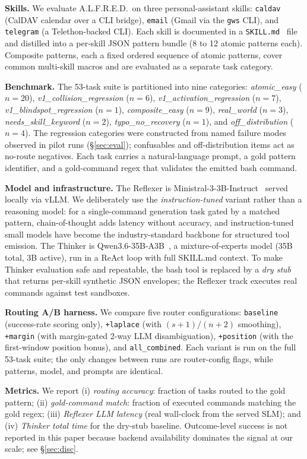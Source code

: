 \label{sec:method}

\textbf{Skills.} We evaluate A.L.F.R.E.D.\ on three personal-assistant skills: \texttt{caldav} (CalDAV calendar over a CLI bridge), \texttt{email} (Gmail via the \texttt{gws} CLI), and \texttt{telegram} (a Telethon-backed CLI). Each skill is documented in a \texttt{SKILL.md}~\cite{anthropic2025skills} file and distilled into a per-skill JSON pattern bundle (8 to 12 atomic patterns each). Composite patterns, each a fixed ordered sequence of atomic patterns, cover common multi-skill macros and are evaluated as a separate task category.

\textbf{Benchmark.} The 53-task suite is partitioned into nine categories: \emph{atomic\_easy} ($n{=}20$), \emph{v1\_collision\_regression} ($n{=}6$), \emph{v1\_activation\_regression} ($n{=}7$), \emph{v1\_blindspot\_regression} ($n{=}1$), \emph{composite\_easy} ($n{=}9$), \emph{real\_world} ($n{=}3$), \emph{needs\_skill\_keyword} ($n{=}2$), \emph{typo\_no\_recovery} ($n{=}1$), and \emph{off\_distribution} ($n{=}4$). The regression categories were constructed from named failure modes observed in pilot runs (\S\ref{sec:eval}); confusables and off-distribution items act as no-route negatives. Each task carries a natural-language prompt, a gold pattern identifier, and a gold-command regex that validates the emitted bash command.

\textbf{Model and infrastructure.} The Reflexer is Ministral-3-3B-Instruct~\cite{ministral2025} served locally via vLLM. We deliberately use the \emph{instruction-tuned} variant rather than a reasoning model: for a single-command generation task gated by a matched pattern, chain-of-thought adds latency without accuracy, and instruction-tuned small models have become the industry-standard backbone for structured tool emission. The Thinker is Qwen3.6-35B-A3B~\cite{qwen3_6}, a mixture-of-experts model (35B total, 3B active), run in a ReAct loop with full SKILL.md context. To make Thinker evaluation safe and repeatable, the bash tool is replaced by a \emph{dry stub} that returns per-skill synthetic JSON envelopes; the Reflexer track executes real commands against test sandboxes.

\textbf{Routing A/B harness.} We compare five router configurations: \texttt{baseline} (success-rate scoring only), \texttt{+laplace} (with $(s{+}1)/(n{+}2)$ smoothing), \texttt{+margin} (with margin-gated 2-way LLM disambiguation), \texttt{+position} (with the first-window position bonus), and \texttt{all\_combined}. Each variant is run on the full 53-task suite; the only changes between runs are router-config flags, while patterns, model, and prompts are identical.

\textbf{Metrics.} We report (i) \emph{routing accuracy}: fraction of tasks routed to the gold pattern; (ii) \emph{gold-command match}: fraction of executed commands matching the gold regex; (iii) \emph{Reflexer LLM latency} (real wall-clock from the served SLM); and (iv) \emph{Thinker total time} for the dry-stub baseline. Outcome-level success is not reported in this paper because backend availability dominates the signal at our scale; see \S\ref{sec:disc}.
